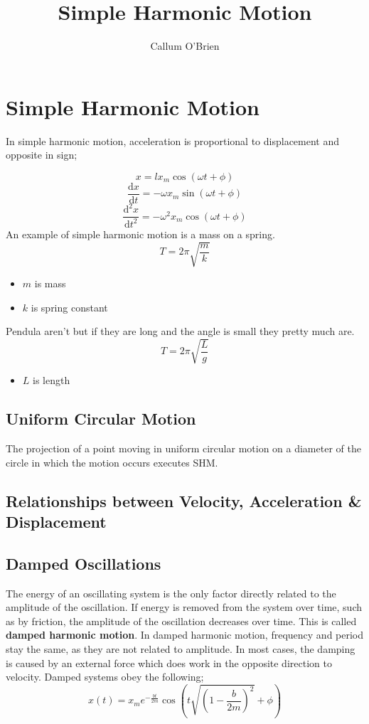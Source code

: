 \documentclass{article}
\title{Simple Harmonic Motion}
\author{Callum O'Brien}
\begin{document}
\maketitle
\tableofcontents

\section{Simple Harmonic Motion}

\noindent In simple harmonic motion, acceleration is proportional to displacement and opposite in sign;

\[x=lx_m\cos(\omega t+\phi)\]
\[\frac{\textrm{d}x}{\textrm{d}t}=-\omega x_m\sin(\omega t+\phi)\]
\[\frac{\textrm{d}^2x}{\textrm{d}t^2}=-\omega^2x_m\cos(\omega t+\phi)\]
An example of simple harmonic motion is a mass on a spring. 
\[T=2\pi\sqrt{\frac{m}{k}}\]
\begin{itemize}
	\item $m$ is mass
	\item $k$ is spring constant
\end{itemize}
Pendula aren't but if they are long and the angle is small they pretty much are.
\[T=2\pi\sqrt{\frac{L}{g}}\]
\begin{itemize}
	\item $L$ is length
\end{itemize}

\subsection{Uniform Circular Motion}
The projection of a point moving in uniform circular motion on a diameter of the circle in which the motion occurs executes SHM.

\subsection{Relationships between Velocity, Acceleration \& Displacement}

\subsection{Damped Oscillations}
The energy of an oscillating system is the only factor directly related to the amplitude of the oscillation. If energy is removed from the system over time, such as by friction, the amplitude of the oscillation decreases over time. This is called \textbf{damped harmonic motion}. In damped harmonic motion, frequency and period stay the same, as they are not related to amplitude. In most cases, the damping is caused by an external force which does work in the opposite direction to velocity. Damped systems obey the following;
\[x(t)=x_me^{-\frac{bt}{2m}}\cos\left(t\sqrt{\left(1-\frac{b}{2m}\right)^2}+\phi\right)\]
\end{document}
